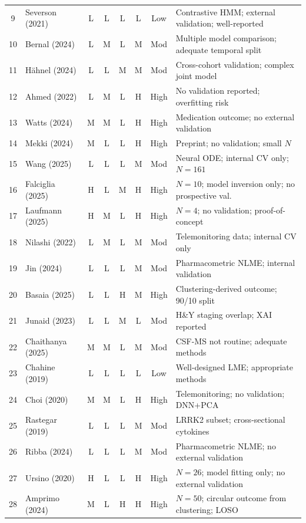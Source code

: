 \begin{longtable}{@{}cl ccccc p{5cm}@{}}
9  & Severson (2021)    & L & L & L & L & Low  & Contrastive HMM; external validation; well-reported \\
10 & Bernal (2024)      & L & M & L & M & Mod  & Multiple model comparison; adequate temporal split \\
11 & H\"ahnel (2024)    & L & L & M & M & Mod  & Cross-cohort validation; complex joint model \\
12 & Ahmed (2022)       & L & M & L & H & High & No validation reported; overfitting risk \\
13 & Watts (2024)       & M & M & L & H & High & Medication outcome; no external validation \\
14 & Mekki (2024)       & M & L & L & H & High & Preprint; no validation; small $N$ \\
15 & Wang (2025)        & L & L & L & M & Mod  & Neural ODE; internal CV only; $N=161$ \\
16 & Falciglia (2025)   & H & L & M & H & High & $N=10$; model inversion only; no prospective val.\ \\
17 & Laufmann (2025)    & H & M & L & H & High & $N=4$; no validation; proof-of-concept \\
18 & Nilashi (2022)     & L & M & L & M & Mod  & Telemonitoring data; internal CV only \\
19 & Jin (2024)         & L & L & L & M & Mod  & Pharmacometric NLME; internal validation \\
20 & Basaia (2025)      & L & L & H & M & High & Clustering-derived outcome; 90/10 split \\
21 & Junaid (2023)      & L & L & M & L & Mod  & H\&Y staging overlap; XAI reported \\
22 & Chaithanya (2025)  & M & M & L & M & Mod  & CSF-MS not routine; adequate methods \\
23 & Chahine (2019)     & L & L & L & L & Low  & Well-designed LME; appropriate methods \\
24 & Choi (2020)        & M & M & L & H & High & Telemonitoring; no validation; DNN+PCA \\
25 & Rastegar (2019)    & L & L & L & M & Mod  & LRRK2 subset; cross-sectional cytokines \\
26 & Ribba (2024)       & L & L & L & M & Mod  & Pharmacometric NLME; no external validation \\
27 & Ursino (2020)      & H & L & L & H & High & $N=26$; model fitting only; no external validation \\
28 & Amprimo (2024)     & M & L & H & H & High & $N=50$; circular outcome from clustering; LOSO \\

\end{longtable}
